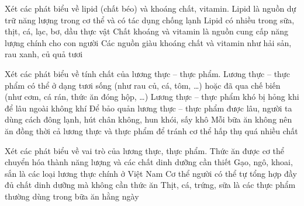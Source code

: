 \documentclass[Main.tex]{subfiles}
\begin{document}
\begin{ex}%
	Xét các phát biểu về lipid (chất béo) và khoáng chất, vitamin.
	\choiceTF
	{\True Lipid là nguồn dự trữ năng lượng trong cơ thể và có tác dụng chống lạnh}
	{\True Lipid có nhiều trong sữa, thịt, cá, lạc, bơ, dầu thực vật}
	{Chất khoáng và vitamin là nguồn cung cấp năng lượng chính cho con người}
	{\True Các nguồn giàu khoáng chất và vitamin như hải sản, rau xanh, củ quả tươi}
\end{ex}

\begin{ex}%
	Xét các phát biểu về tính chất của lương thực -- thực phẩm.
	\choiceTF
	{\True Lương thực -- thực phẩm có thể ở dạng tươi sống (như rau củ, cá, tôm, …) hoặc đã qua chế biến (như cơm, cá rán, thức ăn đóng hộp, …)}
	{Lương thực -- thực phẩm khó bị hỏng khi để lâu ngoài không khí}
	{\True Để bảo quản lương thực -- thực phẩm được lâu, người ta dùng cách đông lạnh, hút chân không, hun khói, sấy khô}
	{Mỗi bữa ăn không nên ăn đồng thời cả lương thực và thực phẩm để tránh cơ thể hấp thụ quá nhiều chất}
\end{ex}

\begin{ex}%
	Xét các phát biểu về vai trò của lương thực, thực phẩm.
	\choiceTF
	{\True Thức ăn được cơ thể chuyển hóa thành năng lượng và các chất dinh dưỡng cần thiết}
	{\True Gạo, ngô, khoai, sắn là các loại lương thực chính ở Việt Nam}
	{Cơ thể người có thể tự tổng hợp đầy đủ chất dinh dưỡng mà không cần thức ăn}
	{\True Thịt, cá, trứng, sữa là các thực phẩm thường dùng trong bữa ăn hằng ngày}
\end{ex}
\end{document}
